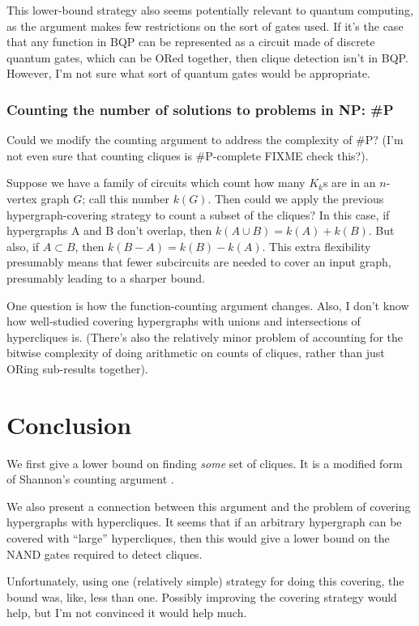 \documentclass[12pt]{article}
\theoremstyle{definition}
\begin{document}
This lower-bound strategy also seems potentially
relevant to quantum computing,
as the argument makes few restrictions on the sort of gates used.
If it's the case that any function in BQP can be represented
as a circuit made of discrete quantum gates, which can be
ORed together, then clique detection isn't in BQP.
However, I'm not sure what sort of quantum gates would be
appropriate.

\subsubsection{Counting the number of solutions to problems in NP: \#P}

Could we modify the counting argument to address the complexity 
of \#P? (I'm not even sure that counting cliques is
\#P-complete FIXME check this?).

Suppose we have a family of circuits which count how
many $K_k$s are in an $n$-vertex graph $G$; call this number
$k(G)$. Then could we apply the
previous hypergraph-covering strategy to count a subset of the
cliques? In this case, if hypergraphs A and B don't overlap, then
$k(A \cup B) = k(A)+k(B)$. 
But also, if $A \subset B$, then $k(B - A) = k(B)-k(A)$. 
This extra flexibility presumably means that fewer subcircuits are
needed to cover an input graph, presumably leading to a sharper bound.

One question is how the function-counting argument changes.
Also, I don't know how well-studied
covering hypergraphs with unions and intersections of
hypercliques is.
(There's also the relatively minor problem of accounting for
the bitwise complexity of doing arithmetic on counts of cliques,
rather than just ORing sub-results
together).

\section{Conclusion}

We first give a lower bound on finding {\em some} set of cliques.
It is a modified form of Shannon's counting argument
\cite{shannon_synthesis_1949}.

We also present a connection between this argument and the problem of covering
hypergraphs with hypercliques.
It seems that if an arbitrary hypergraph can be covered with 
``large'' hypercliques,
then this would give a lower bound on the NAND gates required to
detect cliques.

Unfortunately, using one (relatively simple) strategy for doing this covering,
the bound was, like, less than one. Possibly improving the covering
strategy would help, but I'm not convinced it would help much.
\end{document}
